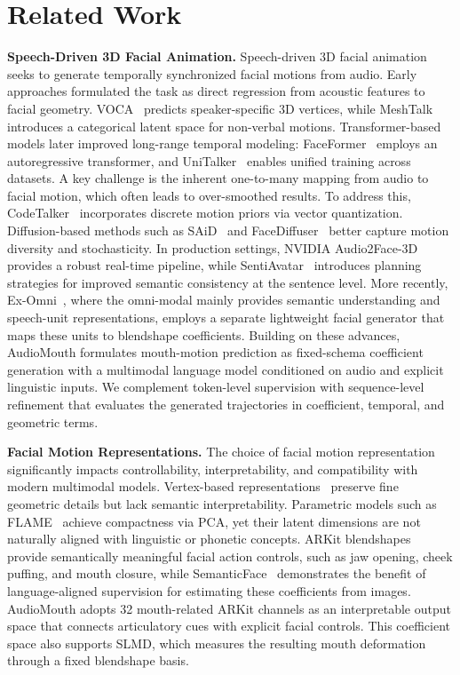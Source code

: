 \section{Related Work}
\noindent\textbf{Speech-Driven 3D Facial Animation.}
Speech-driven 3D facial animation seeks to generate temporally synchronized facial motions from audio. Early approaches formulated the task as direct regression from acoustic features to facial geometry. VOCA~\cite{cudeiro2019voca} predicts speaker-specific 3D vertices, while MeshTalk~\cite{richard2021meshtalk} introduces a categorical latent space for non-verbal motions. Transformer-based models later improved long-range temporal modeling: FaceFormer~\cite{fan2022faceformer} employs an autoregressive transformer, and UniTalker~\cite{fan2024unitalker} enables unified training across datasets.
A key challenge is the inherent one-to-many mapping from audio to facial motion, which often leads to over-smoothed results. To address this, CodeTalker~\cite{xing2023codetalker} incorporates discrete motion priors via vector quantization. Diffusion-based methods such as SAiD~\cite{park2023said} and FaceDiffuser~\cite{stan2023facediffuser} better capture motion diversity and stochasticity. In production settings, NVIDIA Audio2Face-3D~\cite{chung2025audio2face} provides a robust real-time pipeline, while SentiAvatar~\cite{jin2026sentiavatar} introduces planning strategies for improved semantic consistency at the sentence level. More recently, Ex-Omni~\cite{zhang2026ex}, where the omni-modal mainly provides semantic understanding and speech-unit representations, employs a separate lightweight facial generator that maps these units to blendshape coefficients.
Building on these advances, AudioMouth formulates mouth-motion prediction as fixed-schema coefficient generation with a multimodal language model conditioned on audio and explicit linguistic inputs. We complement token-level supervision with sequence-level refinement that evaluates the generated trajectories in coefficient, temporal, and geometric terms.

\noindent\textbf{Facial Motion Representations.}
The choice of facial motion representation significantly impacts controllability, interpretability, and compatibility with modern multimodal models. Vertex-based representations~\cite{cudeiro2019voca,fan2022faceformer} preserve fine geometric details but lack semantic interpretability. Parametric models such as FLAME~\cite{li2017learning} achieve compactness via PCA, yet their latent dimensions are not naturally aligned with linguistic or phonetic concepts.
ARKit blendshapes~\cite{apple_arkit} provide semantically meaningful facial action controls, such as jaw opening, cheek puffing, and mouth closure, while SemanticFace~\cite{kang2026semanticface} demonstrates the benefit of language-aligned supervision for estimating these coefficients from images.
AudioMouth adopts 32 mouth-related ARKit channels as an interpretable output space that connects articulatory cues with explicit facial controls. This coefficient space also supports SLMD, which measures the resulting mouth deformation through a fixed blendshape basis.

